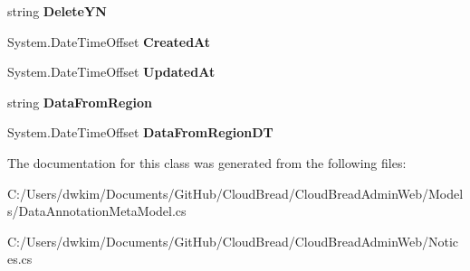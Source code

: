\begin{DoxyCompactItemize}
\item 
string {\bfseries Delete\+YN}\hypertarget{class_cloud_bread_admin_web_1_1_notices_a0f53b0c9e1b05d0b94e41bc536a2c6ee}{}\label{class_cloud_bread_admin_web_1_1_notices_a0f53b0c9e1b05d0b94e41bc536a2c6ee}

\item 
System.\+Date\+Time\+Offset {\bfseries Created\+At}\hypertarget{class_cloud_bread_admin_web_1_1_notices_ab0ebaecfed356e4ffe5c3273e348f50a}{}\label{class_cloud_bread_admin_web_1_1_notices_ab0ebaecfed356e4ffe5c3273e348f50a}

\item 
System.\+Date\+Time\+Offset {\bfseries Updated\+At}\hypertarget{class_cloud_bread_admin_web_1_1_notices_abc807992a04a424a9bdb722d4a222378}{}\label{class_cloud_bread_admin_web_1_1_notices_abc807992a04a424a9bdb722d4a222378}

\item 
string {\bfseries Data\+From\+Region}\hypertarget{class_cloud_bread_admin_web_1_1_notices_a2d4a3491ea227eb387b379e229e9a749}{}\label{class_cloud_bread_admin_web_1_1_notices_a2d4a3491ea227eb387b379e229e9a749}

\item 
System.\+Date\+Time\+Offset {\bfseries Data\+From\+Region\+DT}\hypertarget{class_cloud_bread_admin_web_1_1_notices_a83bd40ff691b789488961e2ce98b3e64}{}\label{class_cloud_bread_admin_web_1_1_notices_a83bd40ff691b789488961e2ce98b3e64}

\end{DoxyCompactItemize}


The documentation for this class was generated from the following files\+:\begin{DoxyCompactItemize}
\item 
C\+:/\+Users/dwkim/\+Documents/\+Git\+Hub/\+Cloud\+Bread/\+Cloud\+Bread\+Admin\+Web/\+Models/Data\+Annotation\+Meta\+Model.\+cs\item 
C\+:/\+Users/dwkim/\+Documents/\+Git\+Hub/\+Cloud\+Bread/\+Cloud\+Bread\+Admin\+Web/Notices.\+cs\end{DoxyCompactItemize}

